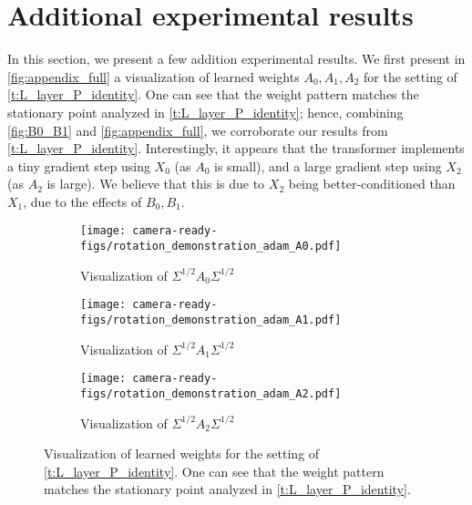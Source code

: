 \documentclass{article}
\begin{document}
 

\section{Additional experimental results}
\label{s:additional_plots}

In this section, we present a few addition experimental results. We first present in \autoref{fig:appendix_full} a visualization of learned weights $A_0,A_1,A_2$ for the setting of \autoref{t:L_layer_P_identity}.
One can see that the weight pattern matches the stationary point analyzed in \autoref{t:L_layer_P_identity}; hence, combining \autoref{fig:B0_B1} and \autoref{fig:appendix_full}, we corroborate our  results from \autoref{t:L_layer_P_identity}. Interestingly, it appears that the transformer implements a tiny gradient step using $X_0$ (as $A_0$ is small), and a large gradient step using $X_2$ (as $A_2$ is large). We believe that this is due to $X_2$ being better-conditioned than $X_1$, due to the effects of $B_0,B_1$. 
\begin{figure}[H] 
\centering
 \begin{subfigure}{0.3\textwidth}
\centering
\texttt{[image: camera-ready-figs/rotation\_demonstration\_adam\_A0.pdf]}
\caption{Visualization of $\Sigma^{1/2} A_0 \Sigma^{1/2}$} 
\label{fig:A0_PQ_app}
\end{subfigure}  
\begin{subfigure}{0.3\textwidth}
\centering
\texttt{[image: camera-ready-figs/rotation\_demonstration\_adam\_A1.pdf]}
\caption{Visualization of $\Sigma^{1/2} A_1 \Sigma^{1/2}$} 
\label{fig:A1_PQ_app}
\end{subfigure}  
\begin{subfigure}{0.3\textwidth}
\centering
\texttt{[image: camera-ready-figs/rotation\_demonstration\_adam\_A2.pdf]}
\caption{Visualization of $\Sigma^{1/2} A_2 \Sigma^{1/2}$} 
\label{fig:A2_PQ_app}
\end{subfigure}  
\caption{Visualization of learned weights  for the setting of \autoref{t:L_layer_P_identity}. One can see that the weight pattern matches the stationary point analyzed in \autoref{t:L_layer_P_identity}.   }
\label{fig:appendix_full}
\end{figure}
\end{document}
